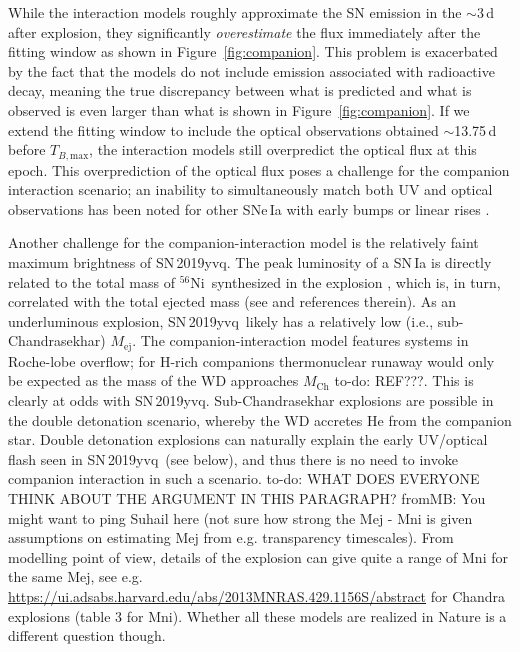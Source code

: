 \documentclass[twocolumn]{aastex63}
\newcommand{\frommb}[1]{{\color{purple} fromMB: {#1}}}
\newcommand{\todo}[1]{{\color{magenta} to-do: {#1}}}
\newcommand{\tbmax}{$T_{B,\mathrm{max}}$}
\newcommand{\radni}{$^{56}$Ni}
\newcommand{\sn}{SN\,2019yvq}
\begin{document}
While the interaction models roughly approximate the SN emission in the
$\sim$3\,d after explosion, they significantly \textit{overestimate} the flux
immediately after the fitting window as shown in Figure~\ref{fig:companion}.
This problem is exacerbated by the fact that the models do not include
emission associated with radioactive decay, meaning the true discrepancy
between what is predicted and what is observed is even larger than what is
shown in Figure~\ref{fig:companion}. If we extend the fitting window to
include the optical observations obtained $\sim$13.75\,d before \tbmax, the
interaction models still overpredict the optical flux at this epoch. This
overprediction of the optical flux poses a challenge for the companion
interaction scenario; an inability to simultaneously match both UV and optical
observations has been noted for other SNe\,Ia with early bumps or linear rises
\citep{Hosseinzadeh17,Miller18}.

Another challenge for the companion-interaction model is the relatively faint
maximum brightness of \sn. The peak luminosity of a SN\,Ia is directly related
to the total mass of \radni\ synthesized in the explosion \citep{Arnett82},
which is, in turn, correlated with the total ejected mass (see
\citealt{Stritzinger06,Scalzo14,Scalzo14a} and references therein). As an
underluminous explosion, \sn\ likely has a relatively low (i.e.,
sub-Chandrasekhar) $M_\mathrm{ej}$. The companion-interaction model features
systems in Roche-lobe overflow; for H-rich companions thermonuclear runaway
would only be expected as the mass of the WD approaches $M_\mathrm{Ch}$
\todo{REF???}. This is clearly at odds with \sn. Sub-Chandrasekhar explosions
are possible in the double detonation scenario, whereby the WD accretes He
from the companion star. Double detonation explosions can naturally explain
the early UV/optical flash seen in \sn\ (see below), and thus there is no need
to invoke companion interaction in such a scenario. \todo{WHAT DOES EVERYONE
THINK ABOUT THE ARGUMENT IN THIS PARAGRAPH?}
\frommb{You might want to ping Suhail here (not sure how strong the Mej - Mni is given assumptions on estimating Mej from e.g. transparency timescales). From modelling point of view, details of the explosion can give quite a range of Mni for the same Mej, see e.g. \url{https://ui.adsabs.harvard.edu/abs/2013MNRAS.429.1156S/abstract} for Chandra explosions (table 3 for Mni). Whether all these models are realized in Nature is a different question though.}
\end{document}
